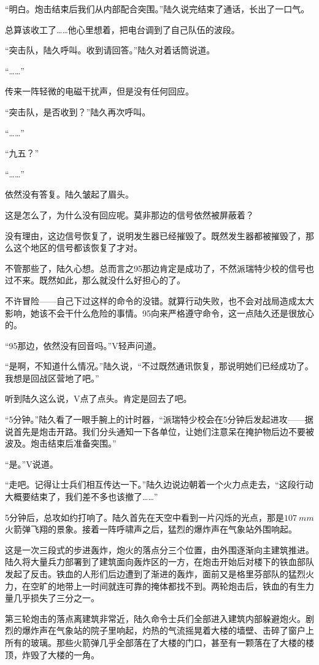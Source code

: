 “明白。炮击结束后我们从内部配合突围。”陆久说完结束了通话，长出了一口气。

总算该收工了……他心里想着，把电台调到了自己队伍的波段。

“突击队，陆久呼叫。收到请回答。”陆久对着话筒说道。

“……”

传来一阵轻微的电磁干扰声，但是没有任何回应。

“突击队，是否收到？”陆久再次呼叫。

“……”

“九五？”

“……”

依然没有答复。陆久皱起了眉头。

这是怎么了，为什么没有回应呢。莫非那边的信号依然被屏蔽着？

没有理由，这边信号恢复了，说明发生器已经摧毁了。既然发生器都被摧毁了，那么这个地区的信号都该恢复了才对。

不管那些了，陆久心想。总而言之95那边肯定是成功了，不然派瑞特少校的信号也过不来。既然如此，那么就没什么好担心的了。

不许冒险——自己下过这样的命令的没错。就算行动失败，也不会对战局造成太大影响，她该不会干什么危险的事情。95向来严格遵守命令，这一点陆久还是很放心的。

“95那边，依然没有回音吗。”V轻声问道。

“是啊，不知道什么情况。”陆久说，“不过既然通讯恢复，那说明她们已经成功了。我想是回战区营地了吧。”

听到陆久这么说，V点了点头。肯定是回去了吧。

“5分钟。”陆久看了一眼手腕上的计时器，“派瑞特少校会在5分钟后发起进攻——据说首先是炮击开路。我们分头通知一下各单位，让她们注意呆在掩护物后边不要被波及。炮击结束后准备突围。”

“是。”V说道。

“走吧。记得让士兵们相互传达一下。”陆久边说边朝着一个火力点走去，“这段行动大概要结束了，我们差不多也该撤了……”

5分钟后，总攻如约打响了。陆久首先在天空中看到一片闪烁的光点，那是$\SI{107}{mm}$火箭弹飞翔的景象。接着一阵呼啸声之后，猛烈的爆炸声在气象站外围响起。

这是一次三段式的步进轰炸，炮火的落点分三个位置，由外围逐渐向主建筑推进。陆久将大量兵力部署到了建筑面向轰炸区的一方，在炮击开始后对楼下的铁血部队发起了反击。铁血的人形们后边遭到了渐进的轰炸，面前又是格里芬部队的猛烈火力，在空旷的地带上一时间就连可靠的掩体都找不到。两轮炮击后，铁血的有生力量几乎损失了三分之一。

第三轮炮击的落点离建筑非常近，陆久命令士兵们全部进入建筑内部躲避炮火。剧烈的爆炸声在气象站的院子里响起，灼热的气流摇晃着大楼的墙壁、击碎了窗户上所有的玻璃。那些火箭弹几乎全部落在了大楼的门口，甚至有一颗落在了大楼的楼顶，炸毁了大楼的一角。

